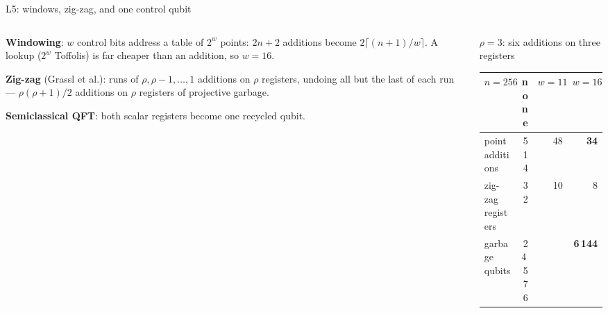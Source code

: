 \documentclass[aspectratio=169,11pt]{beamer}
\begin{document}
\begin{frame}{L5: windows, zig-zag, and one control qubit}
  \begin{columns}[T]
    \begin{column}{0.5\textwidth}
      \small
      \textbf{Windowing}: $w$ control bits address a table of $2^w$ points: $2n+2$ additions become $2\lceil(n+1)/w\rceil$. A lookup ($2^w$ Toffolis) is far cheaper than an addition, so $w=16$.\par\vskip1mm
      \textbf{Zig-zag} (Grassl et al.): runs of $\rho,\rho-1,\dots,1$ additions on $\rho$ registers, undoing all but the last of each run --- $\rho(\rho+1)/2$ additions on $\rho$ registers of projective garbage.\par\vskip1mm
      \textbf{Semiclassical QFT}: both scalar registers become one recycled qubit.
    \end{column}
    \begin{column}{0.46\textwidth}
      \centering
      \par
      {\scriptsize $\rho=3$: six additions on three registers}
      \vskip1mm
      \footnotesize
      \renewcommand{\arraystretch}{1.08}
      \begin{tabular}{@{}lrrr@{}}
        \toprule
        $n=256$ & none & $w=11$ & $w=16$ \\
        \midrule
        point additions & 514 & 48 & \textbf{34} \\
        zig-zag registers & 32 & 10 & 8 \\
        garbage qubits & 24\,576 & & \textbf{6\,144} \\
        \bottomrule
      \end{tabular}
    \end{column}
  \end{columns}
\end{frame}
\end{document}
